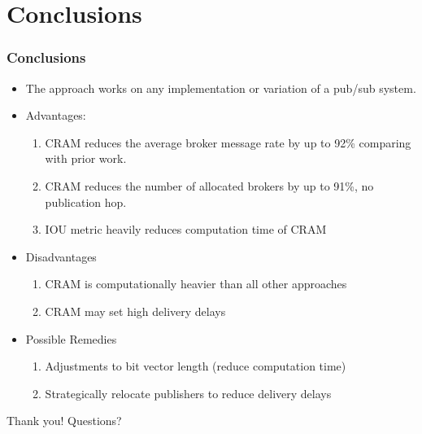 \documentclass{beamer}
\begin{document}
\section{Conclusions}
\begin{frame}
\frametitle{Conclusions}
\begin{itemize}
\item The approach works on any implementation or variation of a pub/sub system.
\item Advantages:
\begin{enumerate}
\item CRAM reduces the average broker message rate by up to 92\% comparing with prior work.
\item CRAM reduces the number of allocated brokers by up to 91\%,
no publication hop.
\item IOU metric heavily reduces computation time of CRAM
\end{enumerate}
\item Disadvantages
\begin{enumerate}
\item CRAM is computationally heavier than all other approaches
\item CRAM may set high delivery delays
\end{enumerate}
\item Possible Remedies
\begin{enumerate}
\item Adjustments to bit vector length (reduce computation time)
\item Strategically relocate publishers to reduce delivery delays
\end{enumerate}


\end{itemize}
\end{frame}

\begin{frame}
Thank you! Questions?
\end{frame}
	
\end{document}
